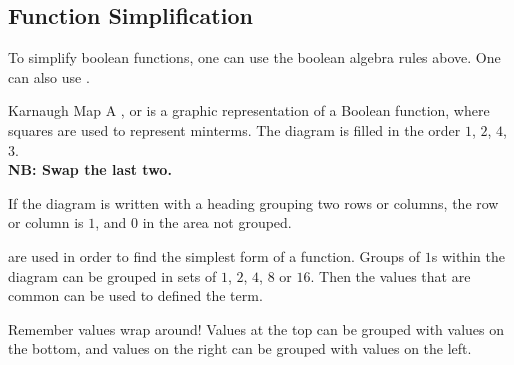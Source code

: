 \documentclass[\main/notes.tex]{subfiles}
\begin{document}
			\subsection{Function Simplification}
				To simplify boolean functions, one can use the boolean algebra rules above. One can also use .
				\begin{definition}{Karnaugh Map}
					A , or  is a graphic representation of a Boolean function, where squares are used to represent minterms. The diagram is filled in the order $1$, $2$, $4$, $3$.\\
					\textbf{NB: Swap the last two.}
					\begin{center}
						\begin{karnaugh-map}[2][2][1][$B$][$A$]
						\end{karnaugh-map}
						\begin{karnaugh-map}[4][2][1][$C$][$B$][$A$]
						\end{karnaugh-map}
						\begin{karnaugh-map}[4][4][1][$D$][$C$][$B$][$A$]
						\end{karnaugh-map}
					\end{center}
					If the diagram is written with a heading grouping two rows or columns, the row or column is $1$, and $0$ in the area not grouped.
				\end{definition}
				 are used in order to find the simplest form of a function. Groups of $1$s within the diagram can be grouped in sets of $1$, $2$, $4$, $8$ or $16$. Then the values that are common can be used to defined the term.
				\begin{sidenote}{Remember values wrap around!}
					Values at the top can be grouped with values on the bottom, and values on the right can be grouped with values on the left.
				\end{sidenote}
				\pagebreak
\end{document}
